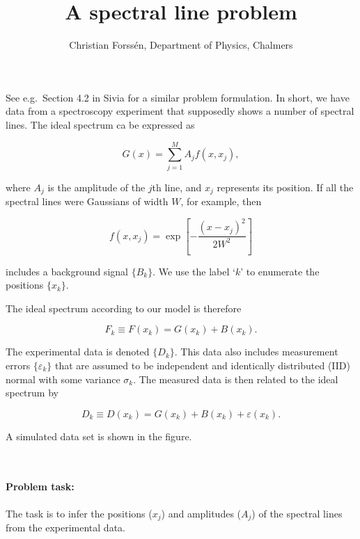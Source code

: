\documentclass{article}
\title{A spectral line problem}
\author{Christian Forss\'en, Department of Physics, Chalmers}
\begin{document}
    
    
    \maketitle
    
    

    
    See e.g.~Section 4.2 in Sivia for a similar problem formulation. In
short, we have data from a spectroscopy experiment that supposedly shows
a number of spectral lines. The ideal spectrum ca be expressed as

\[ G(x) = \sum_{j=1}^M A_j f(x,x_j),\]

where \(A_j\) is the amplitude of the \(j\)th line, and \(x_j\)
represents its position. If all the spectral lines were Gaussians of
width \(W\), for example, then

\[ f(x,x_j) = \exp \left[ - \frac{(x-x_j)^2}{2 W^2} \right]\]

    includes a background signal \(\{ B_k\}\). We use the label `\(k\)' to
enumerate the positions \(\{x_k\}\).

The ideal spectrum according to our model is therefore

\[ F_k \equiv F(x_k) = G(x_k) + B(x_k).\]

    The experimental data is denoted \(\{ D_k\}\). This data also includes
measurement errors \(\{ \varepsilon_k\}\) that are assumed to be
independent and identically distributed (IID) normal with some variance
\(\sigma_k\). The measured data is then related to the ideal spectrum by

\[ D_k \equiv D(x_k) = G(x_k) + B(x_k) + \varepsilon(x_k).\]

A simulated data set is shown in the figure. 
    \begin{center}
    \end{center}
    { \hspace*{\fill} \\}


\paragraph{Problem task:}
The task is to infer the positions (\(x_j\)) and amplitudes (\(A_j\)) of
the spectral lines from the experimental data.
\end{document}
